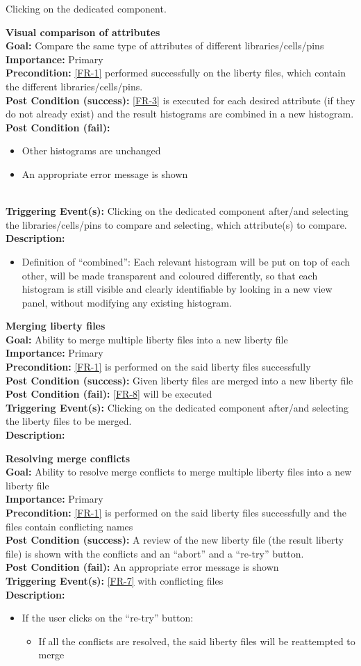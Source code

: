 \documentclass[10pt,a4paper]{report}
\newcommand{\FRDescription}[8]{
    \textbf{#1} \leavevmode \\
    \textbf{Goal: } #2 \leavevmode \\
    \textbf{Importance: } #3 \leavevmode \\
    \textbf{Precondition: } #4 \leavevmode \\
    \textbf{Post Condition (success): } #5 \leavevmode \\
    \textbf{Post Condition (fail): } #6 \leavevmode \\
    \textbf{Triggering Event(s): } #7 \leavevmode \\
    \textbf{Description: } \leavevmode \\ 
    #8}
\begin{document}
\begin{FR}
{    }
    {Clicking on the dedicated component.}
    \item \FRDescription{Visual comparison of attributes}
    {Compare the same type of attributes of different libraries/cells/pins}
    {Primary}
    {\ref{FR-1} performed successfully on the liberty files, which contain the different libraries/cells/pins.}
    {\ref{FR-3} is executed for each desired attribute (if they do not already exist) and the result histograms are combined in a new histogram.}
    {
    \begin{itemize}
        \item Other histograms are unchanged
        \item An appropriate error message is shown
    \end{itemize}
    }
    {Clicking on the dedicated component after/and selecting the libraries/cells/pins to compare and selecting, which attribute(s) to compare.}
    {\begin{itemize}
        \item Definition of “combined”: Each relevant histogram will be put on top of each other, will be made transparent and coloured differently, so that each histogram is still visible and clearly identifiable by looking in a new view panel, without modifying any existing histogram.
    \end{itemize}}
    \item \FRDescription{Merging liberty files}
    {Ability to merge multiple liberty files into a new liberty file}
    {Primary}
    {\ref{FR-1} is performed on the said liberty files successfully}
    {Given liberty files are merged into a new liberty file}
    {\ref{FR-8} will be executed}
    {Clicking on the dedicated component after/and selecting the liberty files to be merged.}
    \item \FRDescription{Resolving merge conflicts}
    {Ability to resolve merge conflicts to merge multiple liberty files into a new liberty file}
    {Primary}
    {\ref{FR-1} is performed on the said liberty files successfully and the files contain conflicting names}
    {A review of the new liberty file (the result liberty file) is shown with the conflicts and an “abort” and a “re-try” button.}
    {An appropriate error message is shown}
    {\ref{FR-7} with conflicting files}
    {\begin{itemize}
        \item If the user clicks on the “re-try” button:
        \begin{itemize}
            \item If all the conflicts are resolved, the said liberty files will be reattempted to merge

\end{itemize}
\end{itemize}}
\end{FR}
\end{document}
